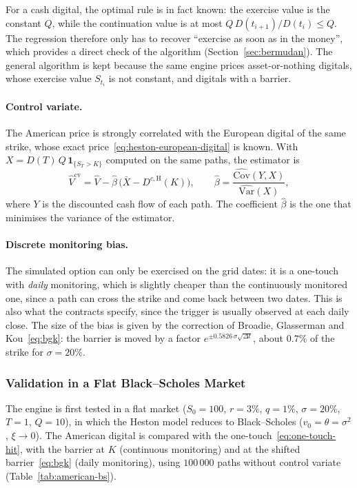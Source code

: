 \documentclass[11pt,a4paper]{article}
\theoremstyle{remark}
\newcommand{\ind}{\mathbf{1}}
\begin{document}
For a cash digital, the optimal rule is in fact known: the exercise value is
the constant $Q$, while the continuation value is at most $Q\,D(t_{i+1})/D(t_i)
\leq Q$. The regression therefore only has to recover ``exercise as soon as in
the money'', which provides a direct check of the algorithm
(Section~\ref{sec:bermudan}). The general algorithm is kept because the same
engine prices asset-or-nothing digitals, whose exercise value $S_{t_i}$ is not
constant, and digitals with a barrier.

\paragraph{Control variate.}
The American price is strongly correlated with the European digital of the
same strike, whose exact price~\eqref{eq:heston-european-digital} is known.
With $X = D(T)\,Q\,\ind_{\{S_T > K\}}$ computed on the same paths, the
estimator is
\begin{equation}
  \hat V^{\mathrm{cv}} = \hat V - \hat\beta\,\bigl(\bar X - D^{c,\mathrm{H}}(K)\bigr),
  \qquad
  \hat\beta = \frac{\widehat{\mathrm{Cov}}(Y, X)}{\widehat{\mathrm{Var}}(X)},
  \label{eq:control-variate}
\end{equation}
where $Y$ is the discounted cash flow of each path. The coefficient
$\hat\beta$ is the one that minimises the variance of the estimator.

\paragraph{Discrete monitoring bias.}
The simulated option can only be exercised on the grid dates: it is a
one-touch with \emph{daily} monitoring, which is slightly cheaper than the
continuously monitored one, since a path can cross the strike and come back
between two dates. This is also what the contracts specify, since the trigger
is usually observed at each daily close. The size of the bias is given by the
correction of Broadie, Glasserman and Kou~\eqref{eq:bgk}: the barrier is
moved by a factor $e^{\pm 0.5826\,\sigma\sqrt{\Delta t}}$, about $0.7\%$ of the
strike for $\sigma = 20\%$.

\subsubsection{Validation in a Flat Black--Scholes Market}

The engine is first tested in a flat market ($S_0 = 100$, $r = 3\%$,
$q = 1\%$, $\sigma = 20\%$, $T = 1$, $Q = 10$), in which the Heston model
reduces to Black--Scholes ($v_0 = \theta = \sigma^2$, $\xi \to 0$). The
American digital is compared with the one-touch~\eqref{eq:one-touch-hit}, with
the barrier at $K$ (continuous monitoring) and at the shifted
barrier~\eqref{eq:bgk} (daily monitoring), using $100\,000$ paths without
control variate (Table~\ref{tab:american-bs}).
\end{document}
